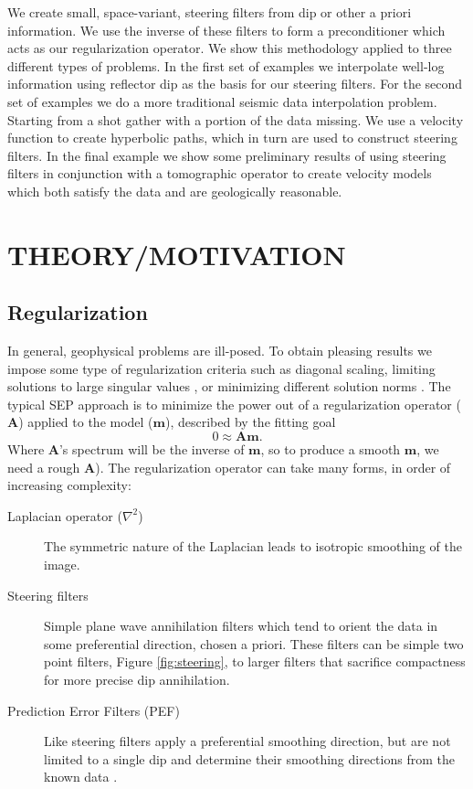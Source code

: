 
We create small, space-variant, steering filters from dip or other a priori 
information.
We use the inverse of these filters to form a preconditioner which acts
as our regularization operator.
We show this methodology applied to three different types of problems. In the 
first set of examples we interpolate 
well-log information using reflector dip as the basis for our steering  filters.
For the second set of examples we do a more traditional 
seismic data interpolation problem.  Starting
from a shot gather with a portion of the data missing.  We use a velocity
function to create hyperbolic paths, which in turn are used to construct 
steering filters.
In the final example we show some preliminary
results of using steering filters in conjunction with 
a tomographic  operator to create velocity models which both satisfy
the data and are geologically reasonable.

\section{THEORY/MOTIVATION}
\subsection{Regularization}

In general, geophysical problems are ill-posed.
To obtain  pleasing results we impose some type of regularization
criteria such as
diagonal scaling, limiting solutions to large 
singular values \cite{Clapp.sep.84.75},  or
minimizing different solution norms \cite{Nichols.sep.82.1}.
The 
typical  SEP approach is to minimize the power out of a regularization
operator ($\mathbf A$) applied to the model ($\mathbf m$),
described by the fitting goal
\begin{equation}
0 \approx \mathbf A  \mathbf m .
\label{eq:first}
\end{equation}
Where $\mathbf A$'s spectrum will be the inverse of $\mathbf m$,
so to produce a smooth $\mathbf m$, we need a rough 
$\mathbf A$\cite{Claerbout.tdf.82}).
The regularization operator can take many forms, in order of increasing
complexity:
\begin{description}
        \item [Laplacian operator ($\nabla^2$)] The symmetric nature of the
Laplacian leads to isotropic smoothing of the image.
  \item [Steering filters] Simple plane wave annihilation filters which
   tend to orient the data in 
   some preferential direction,
   chosen a priori. These filters can be simple two point filters,
   Figure \ref{fig:steering}, to larger filters that sacrifice compactness for
   more precise dip annihilation.

        \item  [Prediction Error Filters (PEF)] Like steering filters apply a 
   preferential smoothing direction, but are not limited to a single dip
    and determine their smoothing directions
         from the known data \cite{Schwab.sep.94.matt2}.
\end{description}


